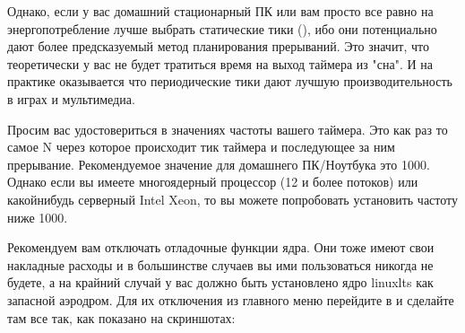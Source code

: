 \documentclass[letterpaper,10pt,russian,openany]{sphinxmanual}
\begin{document}
\sphinxAtStartPar
Однако, если у вас домашний стационарный ПК или вам просто все равно на энергопотребление \sphinxhyphen{} лучше выбрать статические тики (),
ибо они потенциально дают более предсказуемый метод планирования прерываний.
Это значит, что теоретически у вас не будет тратиться время на выход таймера из "сна".
И на практике оказывается что периодические тики дают лучшую производительность в играх и мультимедиа.

\sphinxAtStartPar
{}

\noindent{}

\sphinxAtStartPar
{}

\noindent{}

\sphinxAtStartPar
{}

\noindent{}

\sphinxAtStartPar
{}

\noindent{}

\sphinxAtStartPar
{} Просим вас удостовериться в значениях частоты вашего таймера.
Это как раз то самое N через которое происходит тик таймера и последующее за ним прерывание.
Рекомендуемое значение для домашнего ПК/Ноутбука это 1000.
Однако если вы имеете многоядерный процессор (12 и более потоков) или какой\sphinxhyphen{}нибудь серверный Intel Xeon,
то вы можете попробовать установить частоту ниже 1000.

\sphinxAtStartPar
{}

\noindent{}

\sphinxAtStartPar
{}

\noindent{}

\sphinxAtStartPar
{}

\noindent{}

\sphinxAtStartPar
{} Рекомендуем вам отключать отладочные функции ядра. Они тоже имеют свои накладные расходы и в большинстве случаев
вы ими пользоваться никогда не будете, а на крайний случай у вас должно быть установлено ядро linux\sphinxhyphen{}lts как запасной аэродром.
Для их отключения из главного меню перейдите в  и сделайте там все так, как показано на скриншотах:
\end{document}
